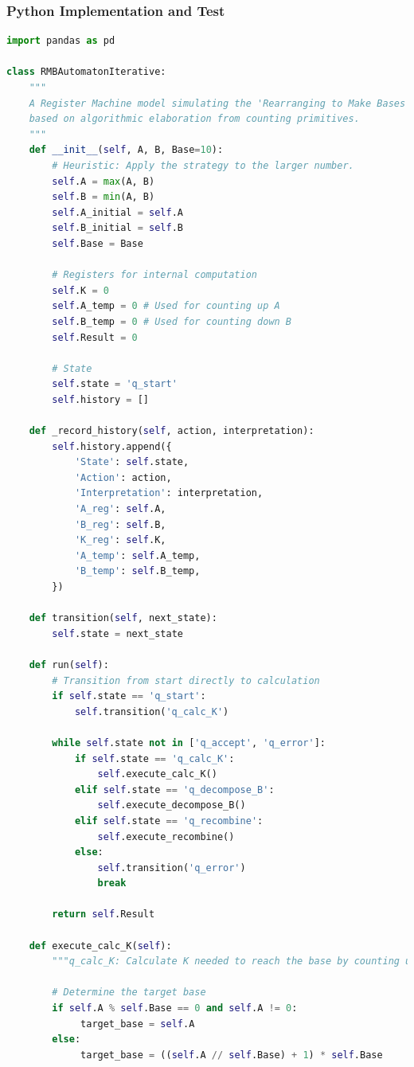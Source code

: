 \documentclass[11pt]{article}
\begin{document}
\subsubsection*{Python Implementation and Test}
\begin{lstlisting}[language=Python]
import pandas as pd

class RMBAutomatonIterative:
    """
    A Register Machine model simulating the 'Rearranging to Make Bases' (RMB) strategy,
    based on algorithmic elaboration from counting primitives.
    """
    def __init__(self, A, B, Base=10):
        # Heuristic: Apply the strategy to the larger number.
        self.A = max(A, B)
        self.B = min(A, B)
        self.A_initial = self.A
        self.B_initial = self.B
        self.Base = Base

        # Registers for internal computation
        self.K = 0
        self.A_temp = 0 # Used for counting up A
        self.B_temp = 0 # Used for counting down B
        self.Result = 0

        # State
        self.state = 'q_start'
        self.history = []

    def _record_history(self, action, interpretation):
        self.history.append({
            'State': self.state,
            'Action': action,
            'Interpretation': interpretation,
            'A_reg': self.A,
            'B_reg': self.B,
            'K_reg': self.K,
            'A_temp': self.A_temp,
            'B_temp': self.B_temp,
        })

    def transition(self, next_state):
        self.state = next_state

    def run(self):
        # Transition from start directly to calculation
        if self.state == 'q_start':
            self.transition('q_calc_K')

        while self.state not in ['q_accept', 'q_error']:
            if self.state == 'q_calc_K':
                self.execute_calc_K()
            elif self.state == 'q_decompose_B':
                self.execute_decompose_B()
            elif self.state == 'q_recombine':
                self.execute_recombine()
            else:
                self.transition('q_error')
                break

        return self.Result

    def execute_calc_K(self):
        """q_calc_K: Calculate K needed to reach the base by counting up from A."""

        # Determine the target base
        if self.A % self.Base == 0 and self.A != 0:
             target_base = self.A
        else:
             target_base = ((self.A // self.Base) + 1) * self.Base


\end{lstlisting}
\end{document}
